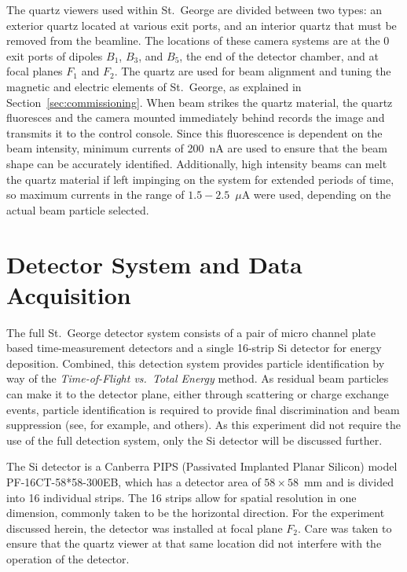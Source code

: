 The quartz viewers used within St.\ George are divided between two
types: an exterior quartz located at various exit ports, and an interior
quartz that must be removed from the beamline. The locations of these
camera systems are at the 0\degree{} exit ports of dipoles $B_1$, $B_3$,
and $B_5$, the end of the detector chamber, and at focal planes $F_1$
and $F_2$. The quartz are used for beam alignment and tuning the
magnetic and electric elements of St.\ George, as explained in
Section~\ref{sec:commissioning}. When beam strikes the quartz material,
the quartz fluoresces and the camera mounted immediately behind records
the image and transmits it to the control console. Since this
fluorescence is dependent on the beam intensity, minimum currents of
200~nA are used to ensure that the beam shape can be accurately
identified. Additionally, high intensity beams can melt the quartz
material if left impinging on the system for extended periods of time,
so maximum currents in the range of $1.5-2.5$~$\mu$A were used,
depending on the actual beam particle selected.


\section{Detector System and Data Acquisition}
\label{sec:detector}

The full St.\ George detector system consists of a pair of micro channel
plate based time-measurement detectors and a single 16-strip Si detector
for energy deposition. Combined, this detection system provides particle
identification by way of the \textit{Time\--{}of\--{}Flight vs.\ Total
Energy} method. As residual beam particles can make it to the detector
plane, either through scattering or charge exchange events, particle
identification is required to provide final discrimination and beam
suppression (see, for example, \cite{James1988, Angulo2001, Engel2005,
DiLeva2008} and others). As this experiment did not require the use of
the full detection system, only the Si detector will be discussed
further.

The Si detector is a Canberra PIPS (Passivated Implanted Planar Silicon)
model PF-16CT-58*58-300EB, which has a detector area of $58\times 58$~mm
and is divided into 16 individual strips. The 16 strips allow for
spatial resolution in one dimension, commonly taken to be the horizontal
direction. For the experiment discussed herein, the detector was
installed at focal plane $F_2$. Care was taken to ensure that the quartz
viewer at that same location did not interfere with the operation of the
detector.

